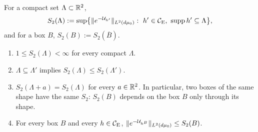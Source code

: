 \begin{auxdef}\label{aux:notation-S2def}
For a compact set $\Lambda\subset\mathbb{R}^2$,
\[
 S_2(\Lambda):=\sup\bigl\{\|e^{-\Uc_{h'}}\|_{L^2(\dmu)}:\ h'\in\CE,\ \supp h'\subseteq\Lambda\bigr\},
\]
and for a box $B$, $S_2(B):=S_2(\overline B)$.
\end{auxdef}

\begin{auxprop}\label{aux:notation-S2}
\begin{enumerate}
\item[\textup{(i)}] $1\le S_2(\Lambda)<\infty$ for every compact $\Lambda$.
\item[\textup{(ii)}] $\Lambda\subseteq\Lambda'$ implies $S_2(\Lambda)\le S_2(\Lambda')$.
\item[\textup{(iii)}] $S_2(\Lambda+a)=S_2(\Lambda)$ for every $a\in\mathbb{R}^2$.  In particular, two
boxes of the same shape have the same $S_2$: $S_2(B)$ depends on the box $B$ only through its
shape.
\item[\textup{(iv)}] For every box $B$ and every $h\in\mathcal{C}_{\mathrm E}$,
$\|e^{-\mathcal U_{h^B}}\|_{L^2(d\mu_0)}\le S_2(B)$.
\end{enumerate}
\end{auxprop}

